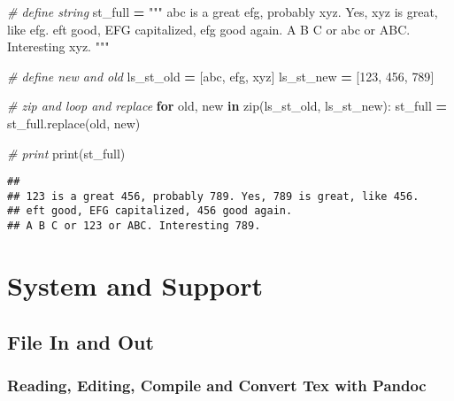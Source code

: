 \documentclass[
]{book}
\newenvironment{Shaded}{\begin{snugshade}}{\end{snugshade}}
\newcommand{\BuiltInTok}[1]{#1}
\newcommand{\CommentTok}[1]{\textcolor[rgb]{0.56,0.35,0.01}{\textit{#1}}}
\newcommand{\ControlFlowTok}[1]{\textcolor[rgb]{0.13,0.29,0.53}{\textbf{#1}}}
\newcommand{\KeywordTok}[1]{\textcolor[rgb]{0.13,0.29,0.53}{\textbf{#1}}}
\newcommand{\NormalTok}[1]{#1}
\newcommand{\OperatorTok}[1]{\textcolor[rgb]{0.81,0.36,0.00}{\textbf{#1}}}
\newcommand{\StringTok}[1]{\textcolor[rgb]{0.31,0.60,0.02}{#1}}
\begin{document}
\begin{Shaded}
\begin{Highlighting}[]
\CommentTok{\# define string}
\NormalTok{st\_full }\OperatorTok{=} \StringTok{"""}
\StringTok{abc is a great efg, probably xyz. Yes, xyz is great, like efg. }
\StringTok{eft good, EFG capitalized, efg good again. }
\StringTok{A B C or abc or ABC. Interesting xyz. }
\StringTok{"""}

\CommentTok{\# define new and old}
\NormalTok{ls\_st\_old }\OperatorTok{=}\NormalTok{ [}\StringTok{\textquotesingle{}abc\textquotesingle{}}\NormalTok{, }\StringTok{\textquotesingle{}efg\textquotesingle{}}\NormalTok{, }\StringTok{\textquotesingle{}xyz\textquotesingle{}}\NormalTok{]}
\NormalTok{ls\_st\_new }\OperatorTok{=}\NormalTok{ [}\StringTok{\textquotesingle{}123\textquotesingle{}}\NormalTok{, }\StringTok{\textquotesingle{}456\textquotesingle{}}\NormalTok{, }\StringTok{\textquotesingle{}789\textquotesingle{}}\NormalTok{]}

\CommentTok{\# zip and loop and replace}
\ControlFlowTok{for}\NormalTok{ old, new }\KeywordTok{in} \BuiltInTok{zip}\NormalTok{(ls\_st\_old, ls\_st\_new):}
\NormalTok{  st\_full }\OperatorTok{=}\NormalTok{ st\_full.replace(old, new)}

\CommentTok{\# print}
\BuiltInTok{print}\NormalTok{(st\_full)}
\end{Highlighting}
\end{Shaded}

\begin{verbatim}
## 
## 123 is a great 456, probably 789. Yes, 789 is great, like 456. 
## eft good, EFG capitalized, 456 good again. 
## A B C or 123 or ABC. Interesting 789.
\end{verbatim}

\hypertarget{system-and-support}{%
\chapter{System and Support}\label{system-and-support}}

\hypertarget{file-in-and-out}{%
\section{File In and Out}\label{file-in-and-out}}

\hypertarget{reading-editing-compile-and-convert-tex-with-pandoc}{%
\subsection{Reading, Editing, Compile and Convert Tex with Pandoc}\label{reading-editing-compile-and-convert-tex-with-pandoc}}
\end{document}
